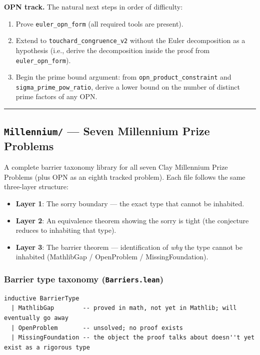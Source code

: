 \documentclass[10pt,a4paper]{article}
\begin{document}
\textbf{OPN track.} The natural next steps in order of difficulty:

\begin{enumerate}
    \item Prove \texttt{euler\_opn\_form} (all required tools are present).
    \item Extend to \texttt{touchard\_congruence\_v2} without the Euler decomposition as a hypothesis
(i.e., derive the decomposition inside the proof from \texttt{euler\_opn\_form}).
    \item Begin the prime bound argument: from \texttt{opn\_product\_constraint} and \texttt{sigma\_prime\_pow\_ratio},
derive a lower bound on the number of distinct prime factors of any OPN.
\end{enumerate}

\begin{center}
\rule{0.5\textwidth}{0.4pt}
\end{center}

\subsection{\texttt{Millennium/} --- Seven Millennium Prize Problems}

A complete barrier taxonomy library for all seven Clay Millennium Prize Problems (plus OPN as an eighth tracked problem). Each file follows the same three-layer structure:

\begin{itemize}
    \item \textbf{Layer 1}: The sorry boundary --- the exact type that cannot be inhabited.
    \item \textbf{Layer 2}: An equivalence theorem showing the sorry is tight (the conjecture reduces to inhabiting that type).
    \item \textbf{Layer 3}: The barrier theorem --- identification of \emph{why} the type cannot be inhabited (MathlibGap / OpenProblem / MissingFoundation).
\end{itemize}

\subsubsection{Barrier type taxonomy (\texttt{Barriers.lean})}

\begin{lstlisting}[language=lean]
inductive BarrierType
  | MathlibGap        -- proved in math, not yet in Mathlib; will eventually go away
  | OpenProblem       -- unsolved; no proof exists
  | MissingFoundation -- the object the proof talks about doesn''t yet exist as a rigorous type
\end{lstlisting}
\end{document}
